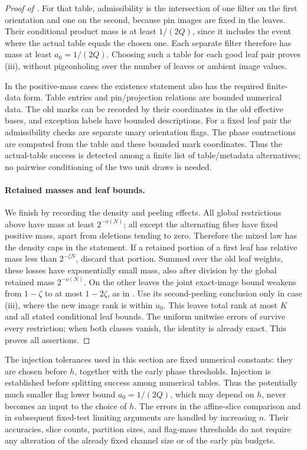 \begin{proof}[Proof of ]
For that table, admissibility is the intersection of one
filter on the first orientation and one on the second,
because pin images are fixed in the leaves.  Their
conditional product mass is at least \(1/(2Q)\), since
it includes the event where the actual table equals the
chosen one.  Each separate filter therefore has mass
at least \(a_0=1/(2Q)\).  Choosing such a table for each
good leaf pair proves (iii), without pigeonholing over
the number of leaves or ambient image values.

In the positive-mass cases the existence statement also
has the required finite-data form.  Table entries and
pin/projection relations are bounded numerical data.
The old marks can be recorded by their coordinates in
the old effective bases, and exception labels have
bounded descriptions.  For a fixed leaf pair the
admissibility checks are separate unary orientation
flags.  The phase contractions are computed from the
table and these bounded mark coordinates.  Thus the
actual-table success is detected among a finite list of
table/metadata alternatives; no pairwise conditioning
of the two unit draws is needed.

\paragraph{Retained masses and leaf bounds.}
We finish by recording the density and peeling effects.
All global restrictions above have mass at least
\(2^{-o(N)}\); all except the alternating fiber have
fixed positive mass, apart from deletions tending to
zero.  Therefore the mixed law has the density caps
in the statement.  If a retained portion of a first
leaf has relative mass less than \(2^{-\zeta N}\),
discard that portion.  Summed over the old leaf
weights, these losses have exponentially small mass,
also after division by the global retained mass
\(2^{-o(N)}\).  On the other leaves the joint
exact-image bound weakens from \(1-\zeta\) to at most
\(1-2\zeta\), as in .
Use its second-peeling conclusion only in case (iii),
where the new image rank is within \(u_0\).
This leaves total rank at most \(K\) and all stated
conditional leaf bounds.  The uniform unitwise errors
of  survive every restriction;
when both classes vanish, the identity is already exact.
This proves all assertions.
\end{proof}

\begin{remark}
\label{rem:preparation-accuracies}
The injection tolerances used in this section are fixed numerical
constants: they are chosen before \(h\), together with the early
phase thresholds.  Injection is established before splitting
success among numerical tables.  Thus the potentially much smaller
flag lower bound \(a_0=1/(2Q)\), which may depend on \(h\), never
becomes an input to the choice of \(h\).
The errors in the affine-slice comparison and in subsequent
fixed-test limiting arguments are handled by increasing \(n\).
Their accuracies, slice counts, partition sizes, and flag-mass
thresholds do not require any alteration of the already fixed
channel size or of the early pin budgets.
\end{remark}
